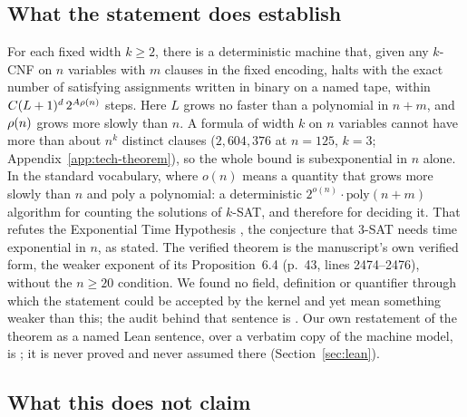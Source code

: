 \subsection{What the statement does establish}
\label{sec:statement-establishes}

For each fixed width $k \ge 2$, there is a deterministic machine that,
given any $k$-CNF on $n$ variables with $m$ clauses in the fixed
encoding, halts with the exact number of satisfying assignments written
in binary on a named tape, within $C(L+1)^d\,2^{A\rho(n)}$ steps. Here
$L$ grows no faster than a polynomial in $n + m$, and $\rho(n)$ grows more
slowly than $n$. A formula of width $k$ on $n$ variables cannot have
more than about $n^k$ distinct clauses ($2{,}604{,}376$ at $n = 125$,
$k = 3$; Appendix~\ref{app:tech-theorem}), so the whole bound is
subexponential in $n$ alone. In the standard vocabulary, where $o(n)$ means a quantity that grows more slowly than $n$ and $\mathrm{poly}$ a polynomial: a deterministic $2^{o(n)} \cdot \mathrm{poly}(n+m)$ algorithm for counting the solutions
of $k$-SAT, and therefore for deciding it. That refutes the Exponential
Time Hypothesis \citep{ImpagliazzoPaturi2001}, the conjecture that
3-SAT needs time exponential in $n$, as stated. The verified theorem is
the manuscript's own verified form, the weaker exponent of its
Proposition~6.4 (p.~43, lines 2474--2476), without the $n \ge 20$
condition. We found no field, definition or quantifier through which
the statement could be accepted by the kernel and yet mean something
weaker than this; the audit behind that sentence is
. Our own
restatement of the theorem as a named Lean sentence, over a verbatim
copy of the machine model, is ; it is never proved
and never assumed there (Section~\ref{sec:lean}).

\subsection{What this does not claim}
\label{sec:statement-not}

